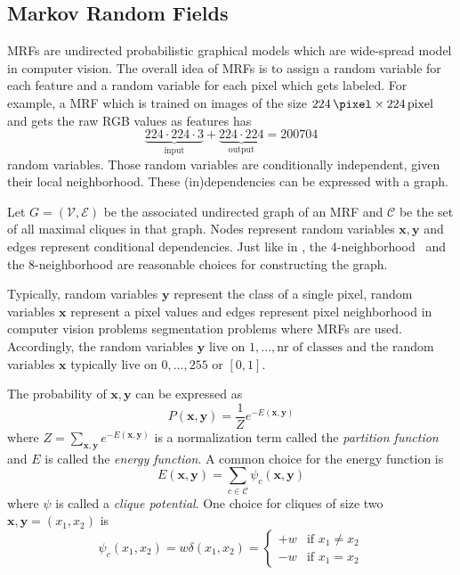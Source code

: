 
\subsection{Markov Random Fields}\label{subsec:markov-random-fields}
\Glspl{MRF} are undirected probabilistic graphical models which are wide-spread
model in computer vision. The overall idea of \glspl{MRF} is to assign a random
variable for each feature and a random variable for each pixel which gets
labeled. For example, a \gls{MRF} which is trained on images of the size
$\SI{224}{\pixel} \times \SI{224}{pixel}$ and gets the raw RGB values as
features has
\[\underbrace{224 \cdot 224 \cdot 3}_{\text{input}} + \underbrace{224 \cdot 224}_{\text{output}} = \num{200704}\]
random variables. Those random variables are conditionally independent, given
their local neighborhood. These (in)dependencies can be expressed with a graph.

Let $G=(\mathcal{V}, \mathcal{E})$ be the associated undirected graph of an
\gls{MRF} and $\mathcal{C}$ be the set of all maximal cliques in that graph.
Nodes represent random variables $\mathbf{x}, \mathbf{y}$ and edges represent
conditional dependencies. Just like in
, the
4-neighborhood~\cite{shotton2006textonboost} and the 8-neighborhood are
reasonable choices for constructing the graph.

Typically, random variables $\mathbf{y}$ represent the class of a single pixel,
random variables $\mathbf{x}$ represent a pixel values and edges represent
pixel neighborhood in computer vision problems segmentation problems where
\glspl{MRF} are used. Accordingly, the random variables $\mathbf{y}$ live on
$1, \dots, \text{nr of classes}$ and the random variables $\mathbf{x}$
typically live on $0, \dots, 255$ or $[0, 1]$.

The probability of $\mathbf{x}, \mathbf{y}$ can be expressed as
\[P(\mathbf{x}, \mathbf{y}) = \frac{1}{Z} e^{-E(\mathbf{x}, \mathbf{y})}\]
where $Z = \sum_{\mathbf{x}, \mathbf{y}} e^{-E(\mathbf{x}, \mathbf{y})}$ is a normalization term called
the \textit{partition function} and $E$ is called the \textit{energy function}.
A common choice for the energy function is
\[E(\mathbf{x}, \mathbf{y}) = \sum_{c \in \mathcal{C}} \psi_c(\mathbf{x}, \mathbf{y})\]
where $\psi$ is called a \textit{clique potential}. One choice for cliques
of size two $\mathbf{x}, \mathbf{y} = (x_1, x_2)$ is~\cite{kato2006markov}
\[\psi_c(x_1, x_2) = w \delta(x_1, x_2) = \begin{cases}+w &\text{if } x_1 \neq x_2\\-w &\text{if } x_1 = x_2\end{cases}\]

